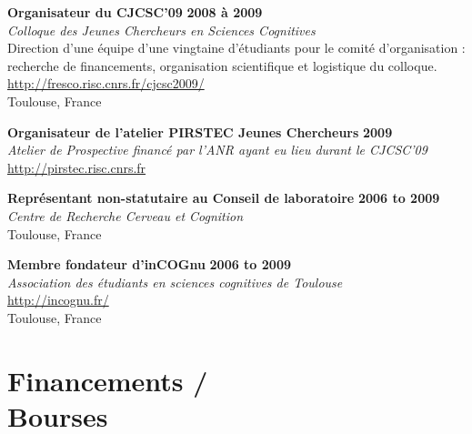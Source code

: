 \documentclass[margin,line]{resume}
\begin{document}
\begin{resume}
	\vspace{-2mm} 
	\textbf{Organisateur du CJCSC'09} \hfill \textbf{2008 à 2009}\\
	\textsl{Colloque des Jeunes Chercheurs en Sciences Cognitives}\\
	Direction d'une équipe d'une vingtaine d'étudiants pour le comité d'organisation : recherche de financements, organisation scientifique et logistique du colloque.\\
	 \url{http://fresco.risc.cnrs.fr/cjcsc2009/}\\
	Toulouse, France	

\newpage

	\vspace{-2mm} 
	\textbf{Organisateur de l'atelier PIRSTEC Jeunes Chercheurs} \hfill \textbf{2009}\\
	\textsl{Atelier de Prospective financé par l'ANR ayant eu lieu durant le CJCSC'09}\\
	\url{http://pirstec.risc.cnrs.fr}

	\vspace{-2mm} 
	\textbf{Représentant non-statutaire au Conseil de laboratoire} \hfill \textbf{2006 to 2009}\\
	\textsl{Centre de Recherche Cerveau et Cognition}\\
	Toulouse, France	

	\vspace{-2mm} 
	\textbf{Membre fondateur d'inCOGnu} \hfill \textbf{2006 to 2009}\\
	\textsl{Association des étudiants en sciences cognitives de Toulouse}\\
	 \url{http://incognu.fr/}\\
	Toulouse, France

	


\vspace{3mm}
    \section{\mysidestyle Financements /\\Bourses}

%
%
%
		

\end{resume}
\end{document}
